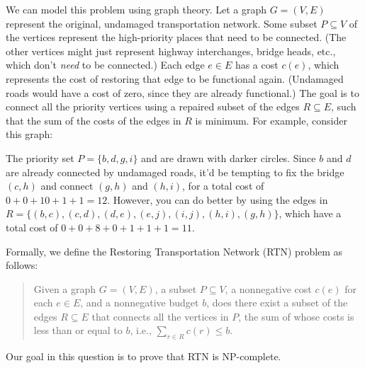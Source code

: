 \documentclass[11pt]{article}
\begin{document}
We can model this problem using graph theory.
Let a graph $G=(V,E)$ represent the original, undamaged transportation network.
Some subset $P\subseteq V$ of the vertices represent the high-priority places
that need to be connected.  (The other vertices might just represent highway
interchanges, bridge heads, etc., which don't \textit{need} to be connected.)
Each edge $e\in E$ has a cost $c(e)$, which represents the cost of restoring
that edge to be functional again.  (Undamaged roads would have a cost
of zero, since they are already functional.)
The goal is to connect all the priority vertices using a repaired subset
of the edges $R\subseteq E$, such that the sum of the costs of the edges
in $R$ is minimum.
For example, consider this graph:
\begin{center}
\end{center}
The priority set $P=\{b,d,g,i\}$ and are drawn with darker circles.
Since $b$ and $d$ are already connected by undamaged roads, it'd
be tempting to fix the bridge $(c,h)$ and connect $(g,h)$ and $(h,i)$,
for a total cost of $0+0+10+1+1=12$.
However, you can do better by using the edges in $R=\{(b,c),(c,d),(d,e),(e,j),(i,j), (h,i), (g,h)\}$, which have a total cost of $0+0+8+0+1+1+1=11$.

Formally, we define the Restoring Transportation Network (RTN) problem
as follows:
\begin{quote}
Given a graph $G=(V,E)$,
a subset $P\subseteq V$,
a nonnegative cost $c(e)$ for each $e\in E$,
and a nonnegative budget $b$,
does there exist a subset of the edges $R\subseteq E$ that connects
all the vertices in $P$, the sum of whose costs is less than or equal
to $b$, i.e., $\sum_{r\in R} c(r) \le b$.
\end{quote}
Our goal in this question is to prove that RTN is NP-complete.
\end{document}
